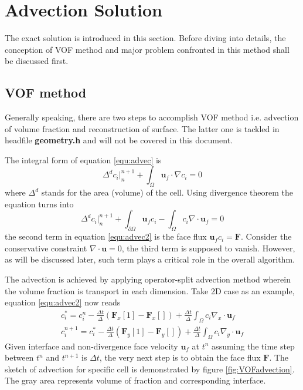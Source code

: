 \documentclass[a4paper]{article}
\begin{document}
\section{Advection Solution}
The exact solution is introduced in this section. Before diving into details, the conception of VOF method and major problem confronted in this method shall be discussed first.
\subsection{VOF method}
Generally speaking, there are two steps to accomplish VOF method i.e. advection of volume fraction and reconstruction of surface. The latter one is tackled in headfile \textbf{geometry.h} and will not be covered in this document.\par
 The integral form of equation \ref{equ:advec} is
\begin{equation}
    \Delta^{d} c_i|^{n+1}_{n} + \int_{\Omega}\mathbf{u}_f\cdot\nabla c_i= 0
\end{equation}
where $\Delta^d$ stands for the area (volume) of the cell.
Using divergence theorem the equation turns into
\begin{equation}\label{equ:advec2}
    \Delta^{d} c_i|^{n+1}_{n} + \int_{\partial\Omega}\mathbf{u}_f c_i - \int_{\Omega}c_i\nabla\cdot \mathbf{u}_f= 0
\end{equation}
the second term in equation \ref{equ:advec2} is the face flux $\mathbf{u}_fc_i=\mathbf{F}$. Consider the conservative constraint $\nabla\cdot\mathbf{u}=0$, the third term is supposed to vanish. However, as will be discussed later, such term plays a critical role in the overall algorithm.\par
The advection is achieved by applying operator-split advection method\cite{2011_Gretar} wherein the volume fraction is transport in each dimension. Take 2D case as an example, equation \ref{equ:advec2} now reads
\begin{align}
    c_i^\ast = c_i^{n} - \frac{\Delta t}{\Delta}(\mathbf{F}_x[1]-\mathbf{F}_x[]) + \frac{\Delta t}{\Delta}\int_{\Omega}c_i\nabla_x\cdot\mathbf{u}_f\label{equ:advec3x}\\
    c_i^{n+1} = c_i^\ast - \frac{\Delta t}{\Delta}(\mathbf{F}_y[1]-\mathbf{F}_y[]) + \frac{\Delta t}{\Delta} \int_{\Omega}c_i\nabla_y\cdot\mathbf{u}_f
\end{align}
Given interface and non-divergence face velocity $\mathbf{u}_f$ at $t^n$ assuming the time step between $t^{n}$ and $t^{n+1}$ is $\Delta t$, the very next step is to obtain the face flux $\mathbf{F}$. The sketch of advection for specific cell is demonstrated by figure \ref{fig:VOFadvection}. The gray area represents volume of fraction and corresponding interface.
\end{document}

